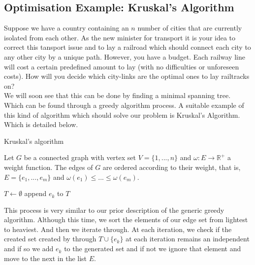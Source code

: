 \documentclass[../main.tex]{subfiles}
\begin{document}
\subsection{Optimisation Example: Kruskal's Algorithm}
\begin{exmp}
Suppose we have a country containing an $n$ number of cities that are currently isolated from each other.  As the new minister for transport it is your idea to correct this tansport issue and to lay a railroad which should connect each city to any other city by a unique path. However, you have a budget. Each railway line will cost a certain predefined amount to lay (with no difficulties or unforeseen costs). How will you decide which city-links are the optimal ones to lay railtracks on?\\
We will soon see that this can be done  by finding a minimal spanning tree. Which can be found through a greedy algorithm process. A suitable example of this kind of algorithm which should solve our problem is Kruskal's Algorithm. Which is detailed below.
\end{exmp}

\begin{algorithm}[H]
\caption{Kruskal's algorithm}\label{kruskal}
Let $G$ be a connected graph with vertex set $V = \{1,...,n\}$ and $\omega:E \longrightarrow \mathbb{R^+}$ a weight function. The edges of $G$ are ordered according to their weight, that is, $E = \{e_1,...,e_m\}$ and $\omega(e_1) \leq ... \leq \omega(e_m).$
\begin{algorithmic}[1]
\State $T\gets \emptyset$
	 	\State append $e_k$ to $T$
	\EndIf
\EndFor
\EndProcedure
\end{algorithmic}
\end{algorithm}

This process is very similar to our prior description of the generic greedy algorithm. Although this time, we sort the elements of our edge set from lightest to heaviest. And then we iterate through. At each iteration, we check if the created set created by through $T \cup \{e_k\}$ at each iteration remains an independent  and if so we add $e_k$ to the generated set and if not we ignore that element and move to the next in the list $E.$

\vspace{2mm}
\end{document}
